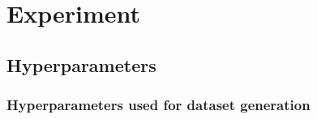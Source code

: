 \documentclass{article}
\begin{document}


\section{Experiment} \label{sec:experiment}


\subsection{Hyperparameters}

\subsubsection{Hyperparameters used for dataset generation}
\end{document}
